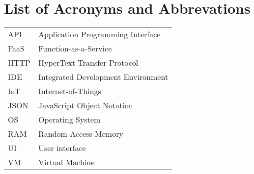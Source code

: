 \chapter*{List of Acronyms and Abbrevations}
\begin{table}[H]
\begin{tabular}{p{2cm}l}
API    & Application Programming Interface    \\[5pt]
FaaS   & Function-as-a-Service                \\[5pt]
HTTP   & HyperText Transfer Protocol          \\[5pt]
IDE    & Integrated Development Environment   \\[5pt]
IoT    & Internet-of-Things                   \\[5pt]
JSON   & JavaScript Object Notation           \\[5pt]
OS     & Operating System                     \\[5pt]
RAM    & Random Access Memory                 \\[5pt]
UI     & User interface                       \\[5pt]
VM     & Virtual Machine                      \\[5pt]
\end{tabular}
\end{table}
